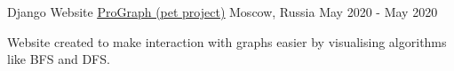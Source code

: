 \begin{cventries}
  \cventry
    {Django Website}
    {\href{https://github.com/Unicorn-Dev/ProGraph}{\underline{ProGraph (pet project)}}} 
    {Moscow, Russia} %
    {May 2020 -  May 2020} %
    {
      \begin{cvitems} %
        \item {Website created to make interaction with graphs easier by 
            visualising algorithms like BFS and DFS.}
      \end{cvitems}
    }

 

\end{cventries}
